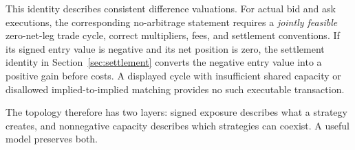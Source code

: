 This identity describes consistent difference valuations. For actual bid and ask executions, the corresponding no-arbitrage statement requires a \emph{jointly feasible} zero-net-leg trade cycle, correct multipliers, fees, and settlement conventions. If its signed entry value is negative and its net position is zero, the settlement identity in Section~\ref{sec:settlement} converts the negative entry value into a positive gain before costs. A displayed cycle with insufficient shared capacity or disallowed implied-to-implied matching provides no such executable transaction.

The topology therefore has two layers: signed exposure describes what a strategy creates, and nonnegative capacity describes which strategies can coexist. A useful model preserves both.
\FloatBarrier
